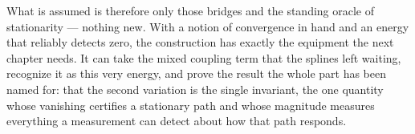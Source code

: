 What is assumed is therefore only those bridges and the standing oracle of stationarity --- nothing
new. With a notion of convergence in hand and an energy that reliably detects zero, the construction has
exactly the equipment the next chapter needs. It can take the mixed coupling term that the splines left
waiting, recognize it as this very energy, and prove the result the whole part has been named for: that
the second variation is the single invariant, the one quantity whose vanishing certifies a stationary
path and whose magnitude measures everything a measurement can detect about how that path responds.

